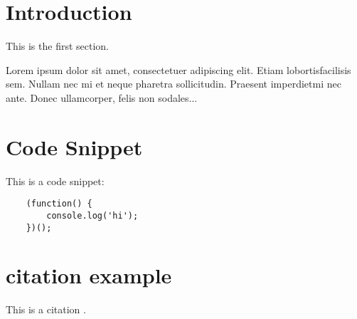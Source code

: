 \section{Introduction}

This is the first section.

Lorem  ipsum  dolor  sit  amet,  consectetuer  adipiscing
elit.   Etiam  lobortisfacilisis sem.  Nullam nec mi et
neque pharetra sollicitudin.  Praesent imperdietmi nec ante.
Donec ullamcorper, felis non sodales...

\section{Code Snippet}

This is a code snippet:

\begin{verbatim}
    (function() {
        console.log('hi');
    })();
\end{verbatim}

\section{citation example}

This is a citation \cite{bower16}.